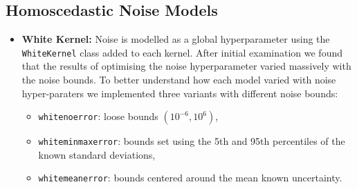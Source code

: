 \documentclass{ucdgradtaughtthesis}
\begin{document}
\subsection{Homoscedastic Noise Models}
\begin{itemize}
    \item \textbf{White Kernel:} Noise is modelled as a global hyperparameter using the \texttt{WhiteKernel} class added to each kernel.
    After initial examination we found that the results of optimising the noise hyperparameter varied massively with the noise bounds. 
    To better understand how each model varied with noise hyper-paraters we implemented three variants with different noise bounds:
    \begin{itemize}
        \item \texttt{whitenoerror}: loose bounds \((10^{-6}, 10^6)\),
        \item \texttt{whiteminmaxerror}: bounds set using the 5th and 95th percentiles of the known standard deviations,
        \item \texttt{whitemeanerror}: bounds centered around the mean known uncertainty.
    \end{itemize}
\end{itemize}
%
%
\end{document}
